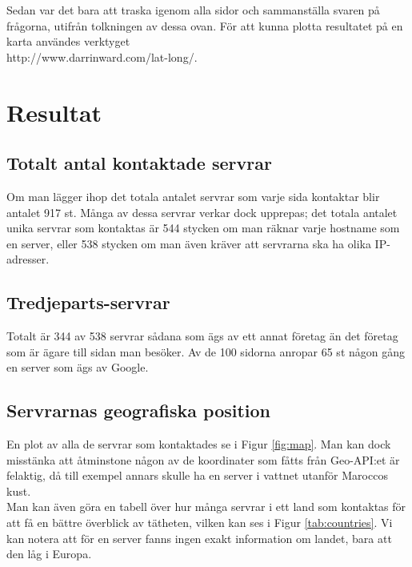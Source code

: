 \documentclass[a4paper]{article}
\begin{document}
Sedan var det bara att traska igenom alla sidor och sammanställa svaren på frågorna, utifrån tolkningen av dessa ovan. För att kunna plotta resultatet på en karta användes verktyget\\
http://www.darrinward.com/lat-long/.


\section{Resultat}
\subsection{Totalt antal kontaktade servrar}
Om man lägger ihop det totala antalet servrar som varje sida kontaktar blir antalet 917 st. Många av dessa servrar verkar dock upprepas; det totala antalet unika servrar som kontaktas är 544 stycken om man räknar varje hostname som en server, eller 538 stycken om man även kräver att servrarna ska ha olika IP-adresser.\\

\subsection{Tredjeparts-servrar}
Totalt är 344 av 538 servrar sådana som ägs av ett annat företag än det företag som är ägare till sidan man besöker. Av de 100 sidorna anropar 65 st någon gång en server som ägs av Google.

\subsection{Servrarnas geografiska position}
En plot av alla de servrar som kontaktades se i Figur \ref{fig:map}. Man kan dock misstänka att åtminstone någon av de koordinater som fåtts från Geo-API:et är felaktig, då till exempel annars skulle ha en server i vattnet utanför Maroccos kust.\\

Man kan även göra en tabell över hur många servrar i ett land som kontaktas för att få en bättre överblick av tätheten, vilken kan ses i Figur \ref{tab:countries}. Vi kan notera att för en server fanns ingen exakt information om landet, bara att den låg i Europa.
\end{document}
